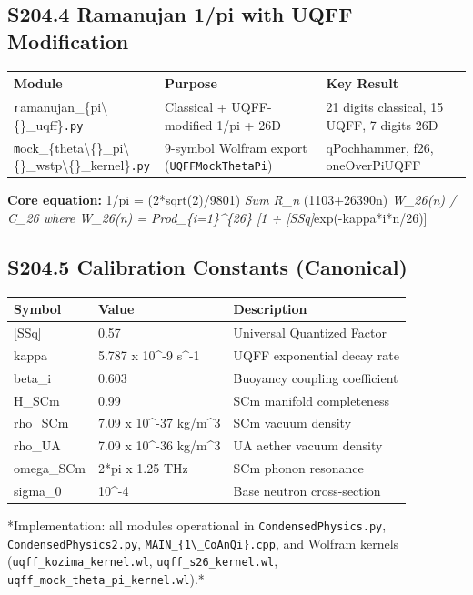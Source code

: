 \documentclass[11pt]{article}
\begin{document}
\subsection*{S204.4 Ramanujan 1/pi with UQFF Modification}

\begin{center}
\begin{longtable}{lll}
\toprule
Module & Purpose & Key Result \tabularnewline
\midrule
\endhead
\verb|r|amanujan\_\{pi\textbackslash\{\}\_uqff\}\verb|.py| & Classical + UQFF-modified 1/pi + 26D & 21 digits classical, 15 UQFF, 7 digits 26D \tabularnewline
\verb|m|ock\_\{theta\textbackslash\{\}\_pi\textbackslash\{\}\_wstp\textbackslash\{\}\_kernel\}\verb|.py| & 9-symbol Wolfram export (\verb|UQFFMockThetaPi|) & qPochhammer, f26, oneOverPiUQFF \tabularnewline
\bottomrule
\end{longtable}
\end{center}

\textbf{Core equation:} 1/pi = (2*sqrt(2)/9801) \emph{ Sum R\_n } (1103+26390n) \emph{ W\_26(n) / C\_26 where W\_26(n) = Prod\_\{i=1\}\textasciicircum{}\{26\} [1 + [SSq]}exp(-kappa*i*n/26)]

\subsection*{S204.5 Calibration Constants (Canonical)}

\begin{center}
\begin{longtable}{lll}
\toprule
Symbol & Value & Description \tabularnewline
\midrule
\endhead
{}[SSq] & 0.57 & Universal Quantized Factor \tabularnewline
kappa & 5.787 x 10\textasciicircum{}-9 s\textasciicircum{}-1 & UQFF exponential decay rate \tabularnewline
beta\_i & 0.603 & Buoyancy coupling coefficient \tabularnewline
H\_SCm & 0.99 & SCm manifold completeness \tabularnewline
rho\_SCm & 7.09 x 10\textasciicircum{}-37 kg/m\textasciicircum{}3 & SCm vacuum density \tabularnewline
rho\_UA & 7.09 x 10\textasciicircum{}-36 kg/m\textasciicircum{}3 & UA aether vacuum density \tabularnewline
omega\_SCm & 2*pi x 1.25 THz & SCm phonon resonance \tabularnewline
sigma\_0 & 10\textasciicircum{}-4 & Base neutron cross-section \tabularnewline
\bottomrule
\end{longtable}
\end{center}

*Implementation: all modules operational in \verb|CondensedPhysics.py|, \verb|CondensedPhysics2.py|, \verb|MAIN_{1\_CoAnQi}.cpp|, and Wolfram kernels (\verb|uqff_kozima_kernel.wl|, \verb|uqff_s26_kernel.wl|, \verb|uqff_mock_theta_pi_kernel.wl|).*
\end{document}
